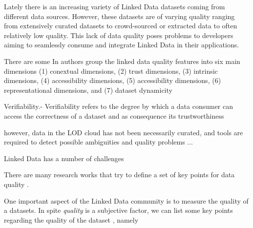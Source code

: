 Lately there is an increasing variety of Linked Data datasets coming from different data sources. However, these datasets are of varying quality ranging from extensively curated datasets to crowd-sourced or extracted data to often relatively low quality. This lack of data quality poses problems to developers aiming to seamlessly consume and integrate Linked Data in their applications.

There are some 
In \cite{} authors group the linked data quality features into six main dimensions (1) conextual dimensions, (2) trust dimensions, (3) intrinsic dimensions, (4) accessibility dimensions, (5) accessibility dimensions, (6) representational dimensions, and (7) dataset dynamicity


Verifiability.- Verifiability refers to the degree by which a data consumer can access the correctness of a dataset and as consequence its trustworthiness


however, data in the LOD cloud has not been necessarily curated, and tools are required to detect possible ambiguities and quality problems ... 

Linked Data has a number of challenges 



There are many research works that try to define a set of key points for data quality \cite{}. 


One important aspect of the Linked Data community is to measure the quality of a datasets. In spite \emph{quality} is a subjective factor, we can list some key points regarding the quality of the dataset \cite{}, namely

